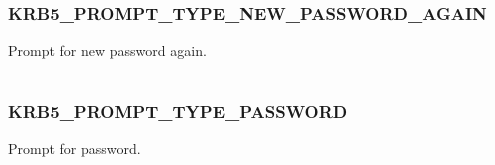 \documentclass[letterpaper,10pt,english]{sphinxmanual}
\begin{document}
\subsubsection{KRB5\_PROMPT\_TYPE\_NEW\_PASSWORD\_AGAIN}
\label{appdev/refs/macros/KRB5_PROMPT_TYPE_NEW_PASSWORD_AGAIN:krb5-prompt-type-new-password-again}\label{appdev/refs/macros/KRB5_PROMPT_TYPE_NEW_PASSWORD_AGAIN:krb5-prompt-type-new-password-again-data}\label{appdev/refs/macros/KRB5_PROMPT_TYPE_NEW_PASSWORD_AGAIN::doc}

\begin{fulllineitems}
\label{appdev/refs/macros/KRB5_PROMPT_TYPE_NEW_PASSWORD_AGAIN:KRB5_PROMPT_TYPE_NEW_PASSWORD_AGAIN}
\end{fulllineitems}


Prompt for new password again.

\begin{tabulary}{\linewidth}{|L|L|}
\hline

 & 
\\
\hline\end{tabulary}



\subsubsection{KRB5\_PROMPT\_TYPE\_PASSWORD}
\label{appdev/refs/macros/KRB5_PROMPT_TYPE_PASSWORD:krb5-prompt-type-password-data}\label{appdev/refs/macros/KRB5_PROMPT_TYPE_PASSWORD::doc}\label{appdev/refs/macros/KRB5_PROMPT_TYPE_PASSWORD:krb5-prompt-type-password}

\begin{fulllineitems}
\label{appdev/refs/macros/KRB5_PROMPT_TYPE_PASSWORD:KRB5_PROMPT_TYPE_PASSWORD}
\end{fulllineitems}


Prompt for password.

\begin{tabulary}{\linewidth}{|L|L|}
\hline

 & 
\\
\hline\end{tabulary}
\end{document}
